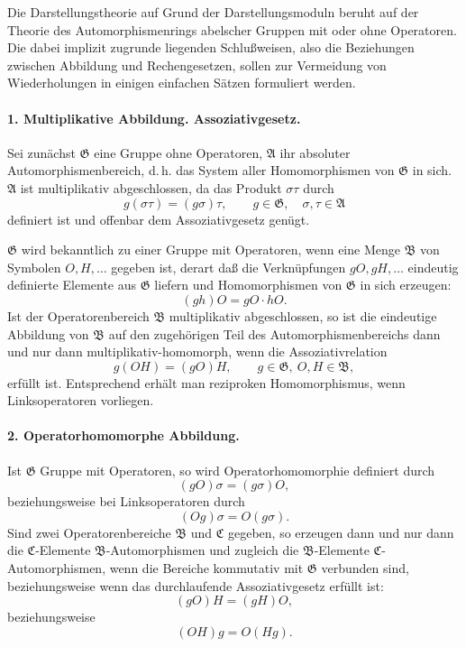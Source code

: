 \documentclass[11pt]{article}
\providecommand{\frA}{\mathfrak A}
\providecommand{\frB}{\mathfrak B}
\providecommand{\frG}{\mathfrak G}
\providecommand{\frC}{\mathfrak C}
\begin{document}
Die Darstellungstheorie auf Grund der Darstellungsmoduln beruht auf der Theorie des Automorphismenrings abelscher Gruppen mit oder ohne Operatoren. Die dabei implizit zugrunde liegenden Schlußweisen, also die Beziehungen zwischen Abbildung und Rechengesetzen, sollen zur Vermeidung von Wiederholungen in einigen einfachen Sätzen formuliert werden.

\paragraph{1. Multiplikative Abbildung. Assoziativgesetz.}
Sei zunächst \(\frG\) eine Gruppe ohne Operatoren, \(\frA\) ihr absoluter Automorphismenbereich, d.\,h. das System aller Homomorphismen von \(\frG\) in sich. \(\frA\) ist multiplikativ abgeschlossen, da das Produkt \( \sigma\tau \) durch
\[
        g(\sigma\tau)=(g\sigma)\tau,
        \qquad g\in\frG,\quad \sigma,\tau\in\frA                         \tag{1}
\]
definiert ist und offenbar dem Assoziativgesetz genügt.

\(\frG\) wird bekanntlich zu einer Gruppe mit Operatoren, wenn eine Menge \(\frB\) von Symbolen \(O,H,\ldots\) gegeben ist, derart daß die Verknüpfungen \(gO,gH,\ldots\) eindeutig definierte Elemente aus \(\frG\) liefern und Homomorphismen von \(\frG\) in sich erzeugen:
\[
        (gh)O=gO\cdot hO .
\]
Ist der Operatorenbereich \(\frB\) multiplikativ abgeschlossen, so ist die eindeutige Abbildung von \(\frB\) auf den zugehörigen Teil des Automorphismenbereichs dann und nur dann multiplikativ-homomorph, wenn die Assoziativrelation
\[
        g(OH)=(gO)H, \qquad g\in\frG,\ O,H\in\frB,                       \tag{1a}
\]
erfüllt ist. Entsprechend erhält man reziproken Homomorphismus, wenn Linksoperatoren vorliegen.

\paragraph{2. Operatorhomomorphe Abbildung.}
Ist \(\frG\) Gruppe mit Operatoren, so wird Operatorhomomorphie definiert durch
\[
        (gO)\sigma=(g\sigma)O,                                          \tag{2}
\]
beziehungsweise bei Linksoperatoren durch
\[
        (Og)\sigma=O(g\sigma).                                          \tag{2*}
\]
Sind zwei Operatorenbereiche \(\frB\) und \(\frC\) gegeben, so erzeugen dann und nur dann die \(\frC\)-Elemente \(\frB\)-Automorphismen und zugleich die \(\frB\)-Elemente \(\frC\)-Automorphismen, wenn die Bereiche kommutativ mit \(\frG\) verbunden sind, beziehungsweise wenn das durchlaufende Assoziativgesetz erfüllt ist:
\[
        (gO)H=(gH)O,                                                    \tag{2a}
\]
beziehungsweise
\[
        (OH)g=O(Hg).                                                    \tag{2a*}
\]
\end{document}
